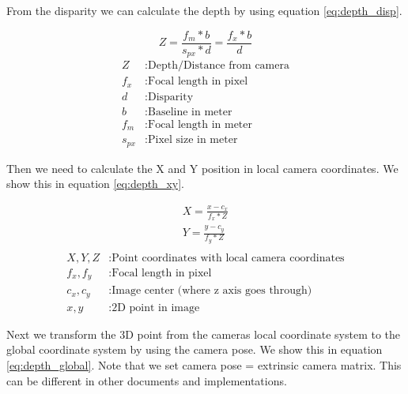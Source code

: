 \documentclass[11pt,a4paper,titlepage,oneside]{report}
\begin{document}
From the disparity we can calculate the depth by using equation \ref{eq:depth_disp}.

\begin{equation}\label{eq:depth_disp}
  Z=\frac{f_m*b}{s_{px}*d}=\frac{f_x*b}{d}
\end{equation}
\begin{align*}
  Z        &: \text{Depth/Distance from camera}\\
  f_x      &: \text{Focal length in pixel}\\
  d        &: \text{Disparity}\\
  b        &: \text{Baseline in meter}\\
  f_m      &: \text{Focal length in meter}\\
  s_{px}  &: \text{Pixel size in meter}
\end{align*}

Then we need to calculate the X and Y position in local camera coordinates. We show this in equation \ref{eq:depth_xy}.

\begin{equation}\label{eq:depth_xy}
  \begin{gathered}
    X = \frac{x-c_x}{f_x*Z}\\
    Y = \frac{y-c_y}{f_y*Z}\\
  \end{gathered}
\end{equation}
\begin{align*}
  X,Y,Z    &: \text{Point coordinates with local camera coordinates}\\
  f_x,f_y  &: \text{Focal length in pixel}\\
  c_x,c_y  &: \text{Image center (where z axis goes through)}\\
  x,y      &: \text{2D point in image}
\end{align*}

Next we transform the 3D point from the cameras local coordinate system to the global coordinate system by using the camera pose. We show this in equation \ref{eq:depth_global}. Note that we set camera pose = extrinsic camera matrix. This can be different in other documents and implementations.
\end{document}
